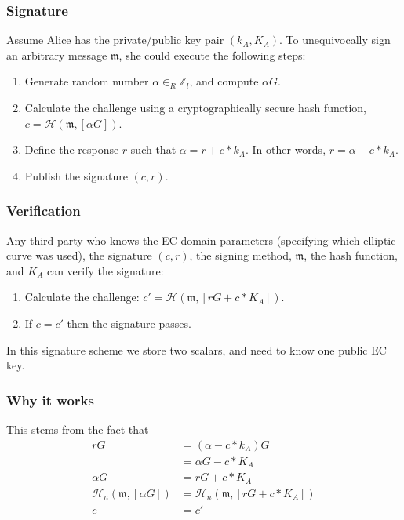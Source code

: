 \subsubsection*{Signature}

Assume Alice has the private/public key pair \((k_A, K_A)\). To unequivocally sign an arbitrary message $\mathfrak{m}$, she could execute the following steps:

\begin{enumerate}
	\item Generate random number $\alpha \in_R \mathbb{Z}_l$, and compute $\alpha G$.
	\item Calculate the challenge using a cryptographically secure hash function, \(c = \mathcal{H}(\mathfrak{m},[\alpha G])\).
	\item Define the response $r$ such that $\alpha = r + c*k_A$. In other words, $r = \alpha - c*k_A$.
	\item Publish the signature $(c, r)$.
\end{enumerate}

\subsubsection*{Verification}

Any third party who knows the EC domain parameters (specifying which elliptic curve was used), the signature $(c, r)$, the signing method, $\mathfrak{m}$, the hash function, and $K_A$ can verify the signature:

\begin{enumerate}
	\item Calculate the challenge: \(c' = \mathcal{H}(\mathfrak{m},[r G + c*K_A])\).
	\item If $c = c'$ then the signature passes.
\end{enumerate}

In this signature scheme we store two scalars, and need to know one public EC key.

\subsubsection*{Why it works}

This stems from the fact that
\begin{align*}
  	 r G &= (\alpha - c*k_A) G \\
  	  	 &= \alpha G - c*K_A \\
\alpha G &= r G + c*K_A \\
\mathcal{H}_n(\mathfrak{m},[\alpha G]) &= \mathcal{H}_n(\mathfrak{m},[r G + c*K_A]) \\
       c &= c'
\end{align*}

